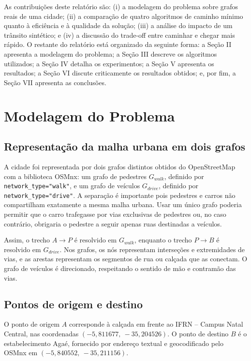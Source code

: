 \documentclass[conference]{IEEEtran}
\begin{document}
As contribuições deste relatório são: (i) a modelagem do problema sobre grafos reais de uma cidade; (ii) a comparação de quatro algoritmos de caminho mínimo quanto à eficiência e à qualidade da solução; (iii) a análise do impacto de um trânsito sintético; e (iv) a discussão do trade-off entre caminhar e chegar mais rápido. O restante do relatório está organizado da seguinte forma: a Seção II apresenta a modelagem do problema; a Seção III descreve os algoritmos utilizados; a Seção IV detalha os experimentos; a Seção V apresenta os resultados; a Seção VI discute criticamente os resultados obtidos; e, por fim, a Seção VII apresenta as conclusões.

\section{Modelagem do Problema}
\subsection{Representação da malha urbana em dois grafos}
A cidade foi representada por dois grafos distintos obtidos do OpenStreetMap com a biblioteca OSMnx: um grafo de pedestres $G_{walk}$, definido por \texttt{network\_type="walk"}, e um grafo de veículos $G_{drive}$, definido por \texttt{network\_type="drive"}. A separação é importante pois pedestres e carros não compartilham exatamente a mesma malha urbana. Usar um único grafo poderia permitir que o carro trafegasse por vias exclusivas de pedestres ou, no caso contrário, obrigaria o pedestre a seguir apenas ruas destinadas a veículos.

Assim, o trecho $A \to P$ é resolvido em $G_{walk}$, enquanto o trecho $P \to B$ é resolvido em $G_{drive}$. Nos grafos, os nós representam interseções e extremidades de vias, e as arestas representam os segmentos de rua ou calçada que as conectam. O grafo de veículos é direcionado, respeitando o sentido de mão e contramão das vias.

\subsection{Pontos de origem e destino}
O ponto de origem $A$ corresponde à calçada em frente ao IFRN -- Campus Natal Central, nas coordenadas $(-5{,}811677,\ -35{,}204526)$. O ponto de destino $B$ é o estabelecimento Agaé, fornecido por endereço textual e geocodificado pelo OSMnx em $(-5{,}840552,\ -35{,}211156)$.
\end{document}
